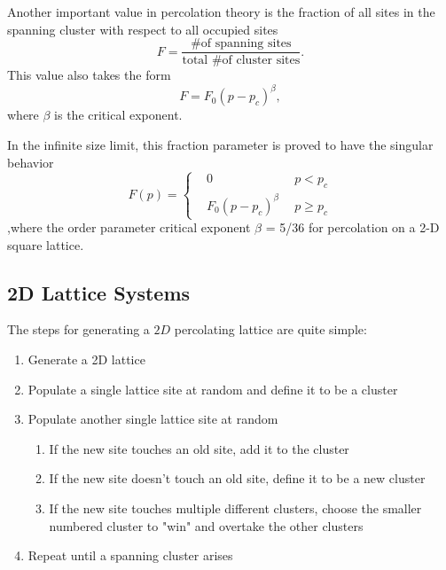 \documentclass[12pt]{article}
\begin{document}
Another important value in percolation theory is the fraction of all sites in the spanning cluster with respect to all occupied sites
\begin{equation}
  \label{eq:fraction}
  F = \frac{\text{\# of spanning sites}}{\text{total \# of cluster sites}}.
  \end{equation}
This value also takes the form
\begin{equation}
  \label{eq:spanningfraction}
  F = F_0 \left(p - p_c\right)^\beta,
\end{equation}
where $\beta$ is the critical exponent.

In the infinite size limit, this fraction parameter is proved to have the singular behavior
\begin{equation}
  \label{eq:spanningfraction2}
F(p) =\left\{
\begin{aligned}
&0 \ \ & p<p_c \\
&F_0(p-p_c)^\beta \ \ & p\geq p_c 
\end{aligned}
\right.
\end{equation}
,where the order parameter critical exponent $\beta$ = 5/36 for percolation on a 2-D square lattice.


\subsection{2D Lattice Systems}
\label{sec:lattice}

The steps for generating a $2D$ percolating lattice are quite simple:
\begin{enumerate}
  \label{code:percolatinglattice}
  \item Generate a 2D lattice
  \item Populate a single lattice site at random and define it to be a cluster
  \item Populate another single lattice site at random
  \begin{enumerate}
    \item If the new site touches an old site, add it to the cluster
    \item If the new site doesn't touch an old site, define it to be a new cluster
    \item If the new site touches multiple different clusters, choose the smaller numbered cluster to "win" and overtake the other clusters
  \end{enumerate}
  \item Repeat until a spanning cluster arises
\end{enumerate}
\end{document}
